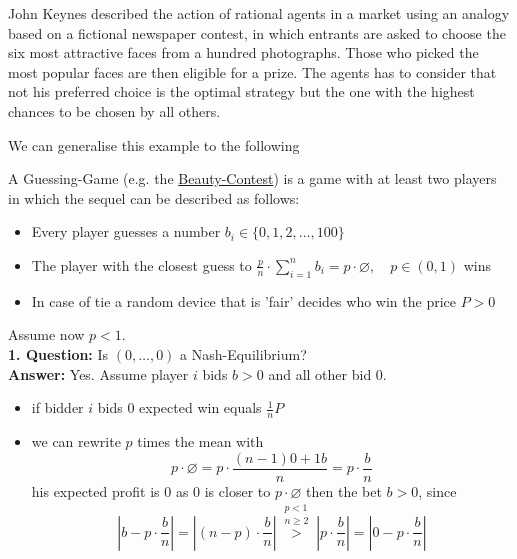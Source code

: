 \begin{example}  \label{Beauty-Contest}
John Keynes described the action of rational agents in a market using an analogy based on a fictional newspaper contest, in which entrants are asked to choose the six most attractive faces from a hundred photographs. Those who picked the most popular faces are then eligible for a prize. The agents has to consider that not his preferred choice is the optimal strategy but the one with the highest chances to be chosen by all others.
\end{example}
We can generalise this example to the following \\
\begin{example}  \label{Guessing-Game}
	 A Guessing-Game (e.g. the \hyperref[Beauty-Contest]{Beauty-Contest}) is a game with at least two players in which the sequel can be described as follows:
	\begin{itemize}
		\item Every player guesses a number $b_{i} \in \{0, 1, 2, \dotsc, 100 \}$
		\item The player with the closest guess to $\frac{p}{n} \cdot \sum_{i = 1}^{n} b_{i} = p \cdot \varnothing, \quad p \in (0, 1)$ wins
		\item In case of tie a random device that is 'fair' decides who win the price $P > 0$
	\end{itemize}
	Assume now $p < 1$. \\
	\textbf{1. Question:} Is $(0, \dotsc, 0)$ a Nash-Equilibrium? \\
	\textbf{Answer:} Yes. Assume player $i$ bids $b > 0$ and all other bid $0$.	
		\begin{itemize}
			\item if bidder $i$ bids $0$ expected win equals $\frac{1}{n} P $
			\item we can rewrite $p$ times the mean with	
				\[ p \cdot \varnothing = p \cdot \frac{(n - 1)0 + 1 b}{n} = p \cdot \frac{b}{n} \]
			his expected profit is $0$ as $0$ is closer to $p \cdot \varnothing$ then the bet $b > 0$, since
			\[ \left| b - p \cdot \frac{b}{n} \right| =  \left|(n-p) \cdot \frac{b}{n} \right| \overset{\substack{p < 1 \\ n \geq 2}}{>} \left| p \cdot \frac{b}{n} \right| = \left| 0 - p \cdot \frac{b}{n} \right| \]
		\end{itemize}
	

\end{example}
